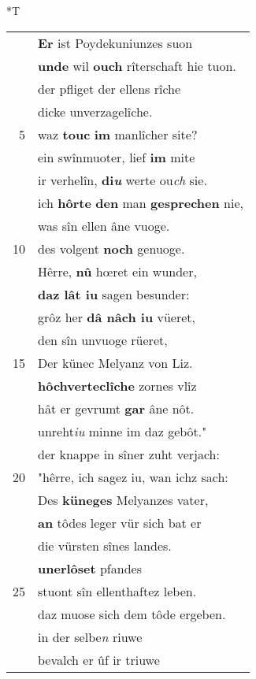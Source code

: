 \documentclass[8pt,a4paper,notitlepage]{article}
\begin{document}
\begin{table}[ht]
\begin{minipage}[t]{0.5\linewidth}
\end{minipage}
\hspace{0.5cm}
\begin{minipage}[t]{0.5\linewidth}
\small
\begin{center}*T
\end{center}
\begin{tabular}{rl}
 & \textbf{Er} ist Poydekuniunzes suon\\ 
 & \textbf{unde} wil \textbf{ouch} rîterschaft hie tuon.\\ 
 & der pfliget der ellens rîche\\ 
 & dicke unverzagelîche.\\ 
5 & waz \textbf{touc} \textbf{im} manlîcher site?\\ 
 & ein swînmuoter, lief \textbf{im} mite\\ 
 & ir verhelîn, \textbf{di\textit{u}} werte ou\textit{ch} sie.\\ 
 & ich \textbf{hôrte} \textbf{den} man \textbf{gesprechen} nie,\\ 
 & was sîn ellen âne vuoge.\\ 
10 & des volgent \textbf{noch} genuoge.\\ 
 & Hêrre, \textbf{nû} hœret ein wunder,\\ 
 & \textbf{daz lât iu} sagen besunder:\\ 
 & grôz her \textbf{dâ nâch iu} vüeret,\\ 
 & den sîn unvuoge rüeret,\\ 
15 & Der künec Melyanz von Liz.\\ 
 & \textbf{hôchverteclîche} zornes vlîz\\ 
 & hât er gevrumt \textbf{gar} âne nôt.\\ 
 & unreht\textit{iu} minne im daz gebôt."\\ 
 & der knappe in sîner zuht verjach:\\ 
20 & "hêrre, ich sagez iu, wan ichz sach:\\ 
 & Des \textbf{küneges} Melyanzes vater,\\ 
 & \textbf{an} tôdes leger vür sich bat er\\ 
 & die vürsten sînes landes.\\ 
 & \textbf{unerlôset} pfandes\\ 
25 & stuont sîn ellenthaftez leben.\\ 
 & daz muose sich dem tôde ergeben.\\ 
 & in der selbe\textit{n} riuwe\\ 
 & bevalch er ûf ir triuwe\\ 

\end{tabular}
\end{minipage}
\end{table}
\end{document}
